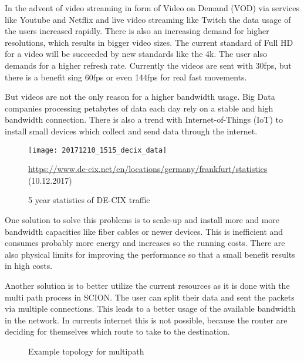 \documentclass[thesis.tex]{subfiles}
\begin{document}
In the advent of video streaming in form of Video on Demand (VOD) via services like Youtube and Netflix and live video streaming like Twitch the data usage of the users increased rapidly. There is also an increasing demand for higher resolutions, which results in bigger video sizes. The current standard of Full HD for a video will be succeeded by new standards like the 4k. The user also demands for a higher refresh rate. Currently the videos are sent with 30fps, but there is a benefit sing 60fps or even 144fps for real fast movements.

But videos are not the only reason for a higher bandwidth usage. Big Data companies processing petabytes of data each day rely on a stable and high bandwidth connection. There is also a trend with Internet-of-Things (IoT) to install small devices which collect and send data through the internet.

\begin{figure}
    \centering
    \texttt{[image: 20171210\_1515\_decix\_data]}
    \caption*{\tiny{ \url{https://www.de-cix.net/en/locations/germany/frankfurt/statistics} (10.12.2017)}}
    \label{fig:intro:decixData}
    \caption{5 year statistics of DE-CIX traffic}
\end{figure}

One solution to solve this problems is to scale-up and install more and more bandwidth capacities like fiber cables or newer devices. This is inefficient and consumes probably more energy and increases so the running costs. There are also physical limits for improving the performance so that a small benefit results in high costs.

Another solution is to better utilize the current resources as it is done with the multi path process in SCION. The user can split their data and sent the packets via multiple connections. This leads to a better usage of the available bandwidth in the network. In currents internet this is not possible, because the router are deciding for themselves which route to take to the destination. 

\begin{figure}[h]
    \centering
    \caption{Example topology for multipath}
    \label{fig:intro:exampleMultipath}
\end{figure}
\end{document}
